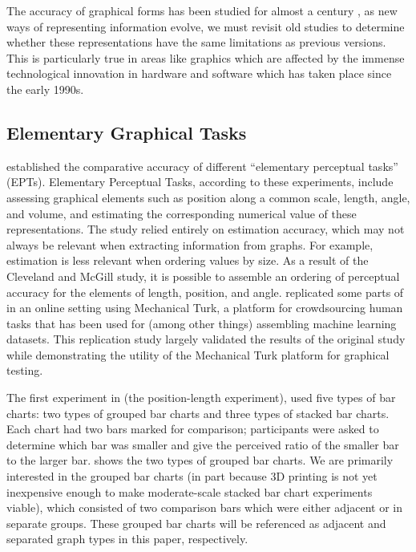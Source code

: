 \documentclass[letterpaper,inpress,dvipsnames]{jdsart}
\begin{document}
The accuracy of graphical forms has been studied for almost a century \citep{vonhuhnFurtherStudiesGraphic1927, eellsRelativeMeritsCircles1926, croxtonGraphicComparisonsBars1932, croxtonBarChartsCircle1927}, as new ways of representing information evolve, we must revisit old studies to determine whether these representations have the same limitations as previous versions. This is particularly true in areas like graphics which are affected by the immense technological innovation in hardware and software which has taken place since the early 1990s.

\hypertarget{elementary-graphical-tasks}{%
\subsection{Elementary Graphical Tasks}\label{elementary-graphical-tasks}}

\citet{clevelandGraphical1984} established the comparative accuracy of different ``elementary perceptual tasks'' (EPTs).
Elementary Perceptual Tasks, according to these experiments, include assessing graphical elements such as position along a common scale, length, angle, and volume, and estimating the corresponding numerical value of these representations.
The study relied entirely on estimation accuracy, which may not always be relevant when extracting information from graphs. For example, estimation is less relevant when ordering values by size.
As a result of the Cleveland and McGill \citeyearpar{clevelandGraphical1984} study, it is possible to assemble an ordering of perceptual accuracy for the elements of length, position, and angle.
\citet{heerCrowdsourcingGraphicalPerception2010b} replicated some parts of \citet{clevelandGraphical1984} in an online setting using Mechanical Turk, a platform for crowdsourcing human tasks that has been used for (among other things) assembling machine learning datasets. This replication study largely validated the results of the original study while demonstrating the utility of the Mechanical Turk platform for graphical testing.

The first experiment in \citet{clevelandGraphical1984} (the position-length experiment), used five types of bar charts: two types of grouped bar charts and three types of stacked bar charts.
Each chart had two bars marked for comparison; participants were asked to determine which bar was smaller and give the perceived ratio of the smaller bar to the larger bar.  shows the two types of grouped bar charts.
We are primarily interested in the grouped bar charts (in part because 3D printing is not yet inexpensive enough to make moderate-scale stacked bar chart experiments viable), which consisted of two comparison bars which were either adjacent or in separate groups.
These grouped bar charts will be referenced as adjacent and separated graph types in this paper, respectively.
\end{document}
